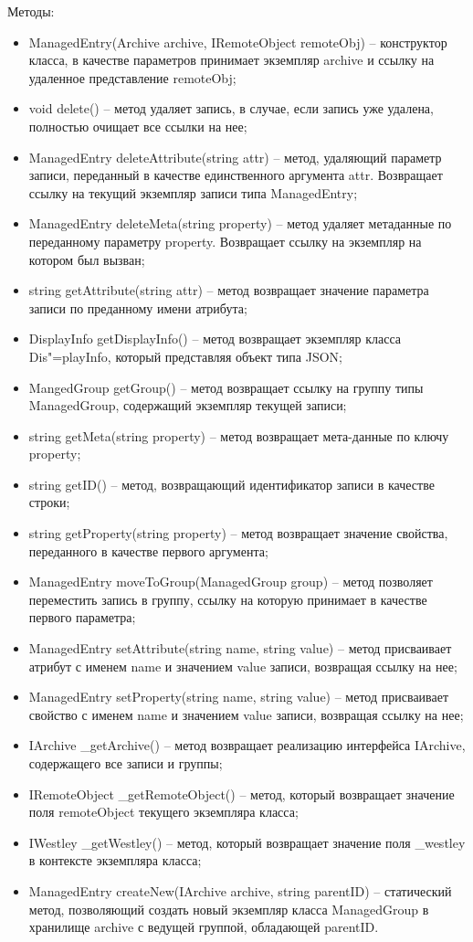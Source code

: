 Методы:
\begin{itemize}
  \item ManagedEntry(Archive archive, IRemoteObject remoteObj) – конструктор класса, в качестве параметров принимает экземпляр archive и ссылку на удаленное представление remoteObj;
  \item void delete() – метод удаляет запись, в случае, если запись уже удалена, полностью очищает все ссылки на нее;
  \item ManagedEntry deleteAttribute(string attr) – метод, удаляющий параметр записи, переданный в качестве единственного аргумента attr. Возвращает ссылку на текущий экземпляр записи типа ManagedEntry;
  \item ManagedEntry deleteMeta(string property) – метод удаляет метаданные по переданному параметру property. Возвращает ссылку на экземпляр на котором был вызван;
  \item string getAttribute(string attr) – метод возвращает значение параметра записи по преданному имени атрибута;
  \item DisplayInfo getDisplayInfo() – метод возвращает экземпляр класса Dis"=playInfo, который представляя объект типа JSON;
  \item MangedGroup getGroup() – метод возвращает ссылку на группу типы ManagedGroup, содержащий экземпляр текущей записи;
  \item string getMeta(string property) – метод возвращает мета-данные по ключу property;
  \item string getID() – метод, возвращающий идентификатор записи в качестве строки;
  \item string getProperty(string property) – метод возвращает значение свойства, переданного в качестве первого аргумента;
  \item ManagedEntry moveToGroup(ManagedGroup group) – метод позволяет переместить запись в группу, ссылку на которую принимает в качестве первого параметра;
  \item ManagedEntry setAttribute(string name, string value) – метод присваивает атрибут с именем name и значением value записи, возвращая ссылку на нее;
  \item ManagedEntry setProperty(string name, string value) – метод присваивает свойство с именем name и значением value записи, возвращая ссылку на нее;
  \item IArchive \_getArchive() – метод возвращает реализацию интерфейса IArchive, содержащего все записи и группы;
  \item IRemoteObject \_getRemoteObject() – метод, который возвращает значение поля remoteObject текущего экземпляра класса;
  \item IWestley \_getWestley() – метод, который возвращает значение поля \_westley в контексте экземпляра класса;
  \item ManagedEntry createNew(IArchive archive, string parentID) – статический метод, позволяющий создать новый экземпляр класса ManagedGroup в хранилище archive с ведущей группой, обладающей parentID.
\end{itemize}

